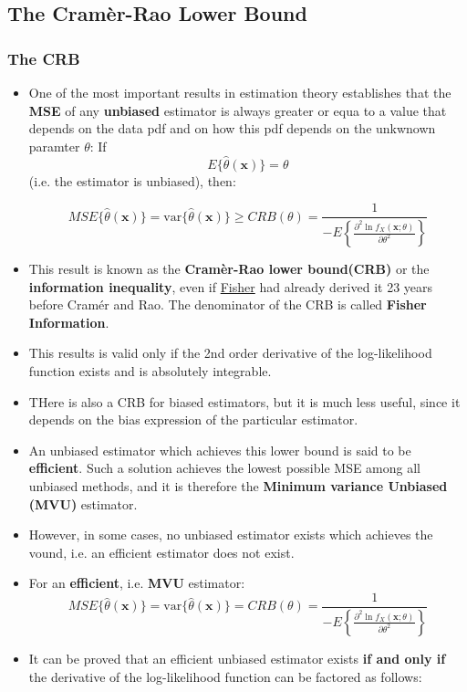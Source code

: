 \subsection{The Cramèr-Rao Lower Bound}
\subsubsection{The CRB}
\begin{itemize}
    \item One of the most important results in estimation theory establishes that the \textbf{MSE} of any \textbf{unbiased} estimator is always greater or equa to a value that depends on the data pdf and on how this pdf depends on the unkwnown paramter \(\theta\):
If $$ E\{\hat{\theta}(\mathbf{x})\} = \theta $$ (i.e. the estimator is unbiased), then:

$$
MSE\{\hat{\theta}(\mathbf{x})\} = \mathrm{var}\{\hat{\theta}(\mathbf{x})\} \geq CRB(\theta) = \frac{1}{-E\left\{\frac{\partial^2 \ln f_X(\mathbf{x}; \theta)}{\partial \theta^2}\right\}}
$$




    \item This result is known as the \textbf{Cramèr-Rao lower bound(CRB)} or the \textbf{information inequality}, even if \underline{Fisher} had already derived it 23 years before Cramér and Rao. The denominator of the CRB is called \textbf{Fisher Information}.
    \item This results is valid only if the 2nd order derivative of the log-likelihood function exists and is absolutely integrable.
    \item THere is also a CRB for biased estimators, but it is much less useful, since it depends on the bias expression of the particular estimator.
    \item An unbiased estimator which achieves this lower bound is said to be \textbf{efficient}. Such a solution achieves the lowest possible MSE among all unbiased methods, and it is therefore the \textbf{Minimum variance Unbiased (MVU)} estimator.
    \item However, in some cases, no unbiased estimator exists which achieves the vound, i.e. an efficient estimator does not exist.
    \item For an \textbf{efficient}, i.e. \textbf{MVU} estimator:
    $$
MSE\{\hat{\theta}(\mathbf{x})\} = \mathrm{var}\{\hat{\theta}(\mathbf{x})\} = CRB(\theta) = \frac{1}{-E \left\{ \frac{\partial^2 \ln f_X(\mathbf{x}; \theta)}{\partial \theta^2} \right\}}
$$
    \item It can be proved that an efficient unbiased estimator exists \textbf{if and only if } the derivative of the log-likelihood function can be factored as follows:


\end{itemize}
